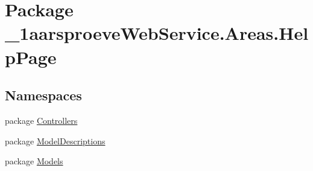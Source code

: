 \hypertarget{namespace__1aarsproeve_web_service_1_1_areas_1_1_help_page}{}\section{Package \+\_\+1aarsproeve\+Web\+Service.\+Areas.\+Help\+Page}
\label{namespace__1aarsproeve_web_service_1_1_areas_1_1_help_page}
\subsection*{Namespaces}
\begin{DoxyCompactItemize}
\item 
package \hyperlink{namespace__1aarsproeve_web_service_1_1_areas_1_1_help_page_1_1_controllers}{Controllers}
\item 
package \hyperlink{namespace__1aarsproeve_web_service_1_1_areas_1_1_help_page_1_1_model_descriptions}{Model\+Descriptions}
\item 
package \hyperlink{namespace__1aarsproeve_web_service_1_1_areas_1_1_help_page_1_1_models}{Models}
\end{DoxyCompactItemize}
